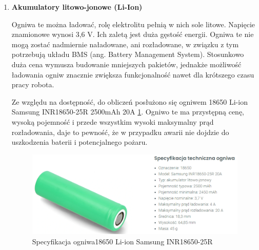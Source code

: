 \documentclass{report}
\begin{document}
\begin{enumerate}[label=(\Alph*)]
    Następnym problemem jest jednorazowość ogniw, jeśli wypadkowa pojemność będzie zbyt mała to używanie ich szybko przestanie być opłacalne. Należy także zwrócić uwagę na to, by wypadkowe napięcie nie spadło poniżej 3 V, czyli dla pakietu 3 baterii szeregowych (3S) 1 V na każdej baterii, a dla 4 ogniw szeregowych (4S) 0,75 V. Z wykresu spadków napięć \ref{fig:duracell} widać, że dla prądu 1 A, czas ten nie przekracza nawet 1,5 godziny. Nawet z zgrubnych obliczeń, przyjmując, że prąd obciążenia jednego silnika wynosi 600 mA, pobór prądu robota będzie wynosił 2,4 A. By ograniczyć pobór prądu na jednym pakiecie ogniw szeregowych do wartości wartych uwagi, należy połączyć je równolegle pięciokrotnie (5P), robot będzie wtedy wstanie pracować w układzie 3-szeregowym (3S5P) przez około 2 godziny i 45 minut, w układzie 4-szeregowym (4S5P) czas ten wydłuży się w przybliżeniu do niecałych 3 godzin (należy jednak pamiętać, że z wzrostem napięcia zasilania silniki pobierają większy prąd, co może skrócić te szacowanie \ref{fig:motor-spec}). W przypadku zwarcia silnika, baterie te zostaną gwałtownie rozładowane i czas pracy robota znacząco spadnie. 
    
    Praca robota nie przekracza trzech godzin, a żeby osiągnąć taki wynik trzeba użyć 15 do 20 baterii. Podsumowując krótko, użycie ogniw alkalicznych jest nieopłacalne.

    \item \textbf{Akumulatory litowo-jonowe (Li-Ion)}

    Ogniwa te można ładować, rolę elektrolitu pełnią w nich sole litowe. Napięcie znamionowe wynosi 3,6 V. Ich zaletą jest duża gęstość energii. Ogniwa te nie mogą zostać nadmiernie naładowane, ani rozładowane, w związku z tym potrzebują układu BMS (ang. Battery Management System). Stosunkowo duża cena wymusza budowanie mniejszych pakietów, jednakże możliwość ładowania ogniw znacznie zwiększa funkcjonalność nawet dla krótszego czasu pracy robota.
    
    Ze względu na dostępność, do obliczeń posłużono się ogniwem 18650 Li-ion Samsung INR18650-25R 2500mAh 20A \ref{fig:spec-18650}. Ogniwo te ma przystępną cenę, wysoką pojemność i przede wszystkim wysoki maksymalny prąd rozładowania, daje to pewność, że w przypadku awarii nie dojdzie do uszkodzenia baterii i potencjalnego pożaru.

    \begin{figure}[H]
        \centering
        \includegraphics{src/tech_specifications/Li-ion Samsung INR18650-25R .png}
        \caption{Specyfikacja ogniwa18650 Li-ion Samsung INR18650-25R }
        \label{fig:spec-18650}
    \end{figure}


\end{enumerate}
\end{document}
